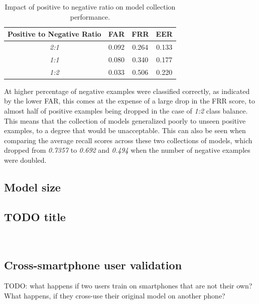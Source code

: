 \begin{center}
	\begin{table}[H]
		\begin{center}
			\begin{tabular}{ |c|c|c|c| } 
				\hline
				Positive to Negative Ratio & FAR & FRR & EER \\
				\hline
				\textit{2:1} & 0.092 & 0.264 & 0.133 \\
				\hline
				\textit{1:1} & 0.080 & 0.340 & 0.177 \\
				\hline
				\textit{1:2} & 0.033 & 0.506 & 0.220 \\
				\hline
			\end{tabular}
		\end{center}
		\caption{Impact of positive to negative ratio on model collection performance.}
		\label{table:egde_encoding_comp}
	\end{table}
\end{center}

At higher percentage of negative examples were classified correctly, as indicated by the lower FAR, this comes at the expense of a large drop in the FRR score, to almost half of positive examples being dropped in the case of \textit{1:2} class balance. This means that the collection of models generalized poorly to unseen positive examples, to a degree that would be unacceptable. This can also be seen when comparing the average recall scores across these two collections of models, which dropped from \textit{0.7357} to \textit{0.692} and \textit{0.494} when the number of negative examples were doubled. 


\subsection{Model size}


\subsection{TODO title}
\\

\subsection{Cross-smartphone user validation}
TODO: what happens if two users train on smartphones that are not their own? What happens, if they cross-use their original model on another phone?
